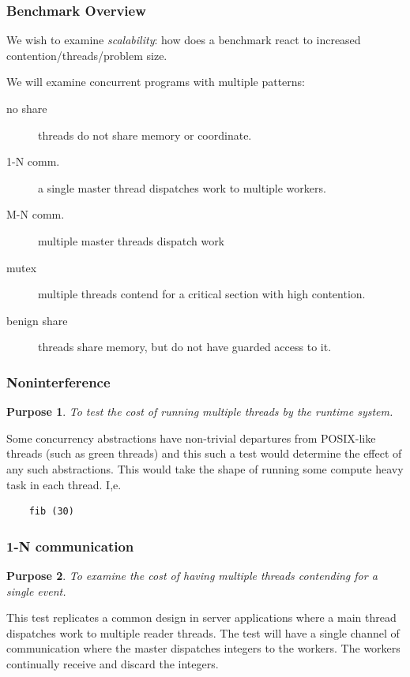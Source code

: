 \documentclass{beamer}
\newtheorem{purpose}{Purpose}
\newcommand{\skipp}[0]{\vskip 0.5cm}
\begin{document}
\begin{frame}
  \frametitle{Benchmark Overview}
  We wish to examine \emph{scalability}: how does a benchmark react to 
  increased contention/threads/problem size.

  We will examine concurrent programs with multiple patterns:

  \begin{description}
  \item[no share] threads do not share memory or coordinate.
  \item[1-N comm.] a single master thread dispatches work to multiple workers.
  \item[M-N comm.] multiple master threads dispatch work
  \item[mutex] multiple threads contend for a critical section with high contention.
  \item[benign share] threads share memory, but do not have guarded access to it.
  \end{description}
\end{frame}

\begin{frame}[fragile]
  \frametitle{Noninterference}
  \begin{purpose}
    To test the cost of running multiple threads by the runtime system.
  \end{purpose}

  Some concurrency abstractions have non-trivial departures from
  POSIX-like threads (such as green threads) and
  this such a test would determine the effect of any such abstractions.
  \skipp
  This would take the shape of running some compute heavy task
  in each thread. I,e.

  \begin{lstlisting}
    fib (30)
  \end{lstlisting}

\end{frame}

\begin{frame}
  \frametitle{1-N communication}
  \begin{purpose}
    To examine the cost of having multiple threads contending for a single event.
  \end{purpose}
  
  This test replicates a common design in server applications where a main thread
  dispatches work to multiple reader threads.
  \skipp
  The test will have a single channel of communication where the master
  dispatches integers to the workers.
  The workers continually receive and discard the integers.
\end{frame}
\end{document}
